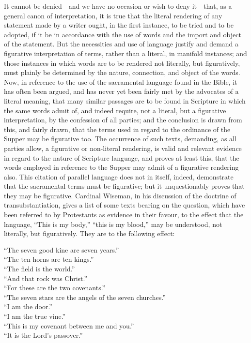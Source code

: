 \documentclass[]{book}
\begin{document}
It cannot be denied---and we have no occasion or wish to deny it---that, as a general canon of interpretation, it is true that the literal rendering of any statement made by a writer ought, in the first instance, to be tried and to be adopted, if it be in accordance with the use of words and the import and object of the statement. But the necessities and use of language justify and demand a figurative interpretation of terms, rather than a literal, in manifold instances; and those instances in which words are to be rendered not literally, but figuratively, must plainly be determined by the nature, connection, and object of the words. Now, in reference to the use of the sacramental language found in the Bible, it has often been argued, and has never yet been fairly met by the advocates of a literal meaning, that many similar passages are to be found in Scripture in which the same words admit of, and indeed require, not a literal, but a figurative interpretation, by the confession of all parties; and the conclusion is drawn from this, and fairly drawn, that the terms used in regard to the ordinance of the Supper may be figurative too. The occurrence of such texts, demanding, as all parties allow, a figurative or non-literal rendering, is valid and relevant evidence in regard to the nature of Scripture language, and proves at least this, that the words employed in reference to the Supper may admit of a figurative rendering also. This citation of parallel language does not in itself, indeed, demonstrate that the sacramental terms must be figurative; but it unquestionably proves that they may be figurative. Cardinal Wiseman, in his discussion of the doctrine of transubstantiation, gives a list of some texts bearing on the question, which have been referred to by Protestants as evidence in their favour, to the effect that the language, ``This is my body,'' ``this is my blood,'' may be understood, not literally, but figuratively. They are to the following effect:

``The seven good kine are seven years.''\\
``The ten horns are ten kings.''\\
``The field is the world.''\\
``And that rock was Christ.''\\
``For these are the two covenants.''\\
``The seven stars are the angels of the seven churches.''\\
``I am the door.''\\
``I am the true vine.''\\
``This is my covenant between me and you.''\\
``It is the Lord's passover.''
\end{document}
